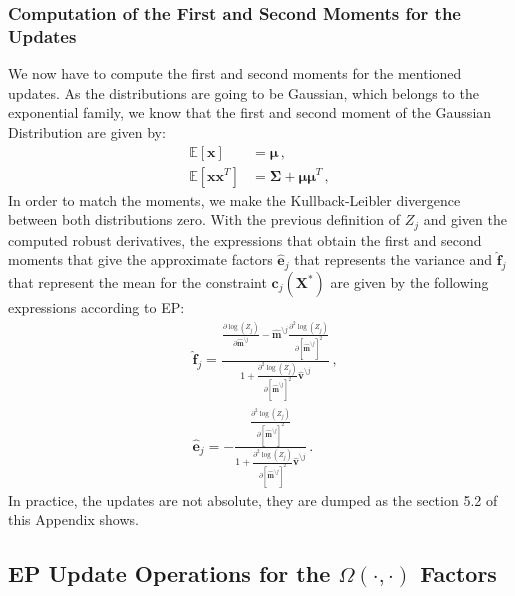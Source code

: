 \subsubsection{Computation of the First and Second Moments for the Updates}

We now have to compute the first and second moments for the mentioned updates. As the distributions are going to be Gaussian, which belongs to the exponential family, we know that the first and second moment of the Gaussian Distribution are given by:
\begin{align}
\mathbb{E}[\boldsymbol{x}] & = \boldsymbol{\mu}\,,\\
\mathbb{E}[\boldsymbol{x}\boldsymbol{x}^T] & = \boldsymbol{\Sigma} + \boldsymbol{\mu}\boldsymbol{\mu}^T\,,
\end{align}
In order to match the moments, we make the Kullback-Leibler divergence between both distributions zero. With the previous definition of $Z_j$ and given the computed robust derivatives, the expressions that obtain the first and second moments that give the approximate factors $\boldsymbol{\hat{e}}_{j}$ that represents the variance and $\boldsymbol{\hat{f}}_{j}$ that represent the mean for the constraint $\boldsymbol{c}_j(\boldsymbol{X}^*)$ are given by the following expressions according to EP:
\begin{align}
& \boldsymbol{\hat{f}}_{j} = \frac{\frac{\partial \log(Z_j)}{\partial \boldsymbol{\hat{m}}^{\setminus j}} - \boldsymbol{\hat{m}}^{\setminus j}\frac{\partial^{2} \log(Z_j)}{\partial [\boldsymbol{\hat{m}}^{\setminus j}]^2}}{1+\frac{\partial^{2} \log(Z_j)}{\partial [\boldsymbol{\hat{m}}^{\setminus j}]^2}\boldsymbol{\hat{v}}^{\setminus j}}\,,\nonumber \\
& \boldsymbol{\hat{e}}_{j} = - \frac{\frac{\partial^{2} \log(Z_j)}{\partial [\boldsymbol{\hat{m}}^{\setminus j}]^2}}{1+\frac{\partial^{2} \log(Z_j)}{\partial [\boldsymbol{\hat{m}}^{\setminus j}]^2}\boldsymbol{\hat{v}}^{\setminus j}}\,.
\end{align}
In practice, the updates are not absolute, they are dumped as the section 5.2 of this Appendix shows.

\subsection{EP Update Operations for the $\Omega(\cdot,\cdot)$ Factors}

